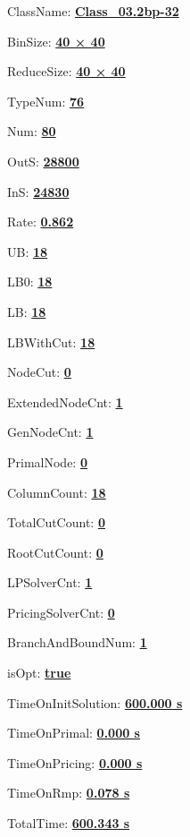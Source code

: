 \documentclass[11pt]{article}
\begin{document}
\pagestyle{empty}


ClassName: \underline{\textbf{Class_03.2bp-32}}
\par
BinSize: \underline{\textbf{40 × 40}}
\par
ReduceSize: \underline{\textbf{40 × 40}}
\par
TypeNum: \underline{\textbf{76}}
\par
Num: \underline{\textbf{80}}
\par
OutS: \underline{\textbf{28800}}
\par
InS: \underline{\textbf{24830}}
\par
Rate: \underline{\textbf{0.862}}
\par
UB: \underline{\textbf{18}}
\par
LB0: \underline{\textbf{18}}
\par
LB: \underline{\textbf{18}}
\par
LBWithCut: \underline{\textbf{18}}
\par
NodeCut: \underline{\textbf{0}}
\par
ExtendedNodeCnt: \underline{\textbf{1}}
\par
GenNodeCnt: \underline{\textbf{1}}
\par
PrimalNode: \underline{\textbf{0}}
\par
ColumnCount: \underline{\textbf{18}}
\par
TotalCutCount: \underline{\textbf{0}}
\par
RootCutCount: \underline{\textbf{0}}
\par
LPSolverCnt: \underline{\textbf{1}}
\par
PricingSolverCnt: \underline{\textbf{0}}
\par
BranchAndBoundNum: \underline{\textbf{1}}
\par
isOpt: \underline{\textbf{true}}
\par
TimeOnInitSolution: \underline{\textbf{600.000 s}}
\par
TimeOnPrimal: \underline{\textbf{0.000 s}}
\par
TimeOnPricing: \underline{\textbf{0.000 s}}
\par
TimeOnRmp: \underline{\textbf{0.078 s}}
\par
TotalTime: \underline{\textbf{600.343 s}}
\par
\newpage


\end{document}

